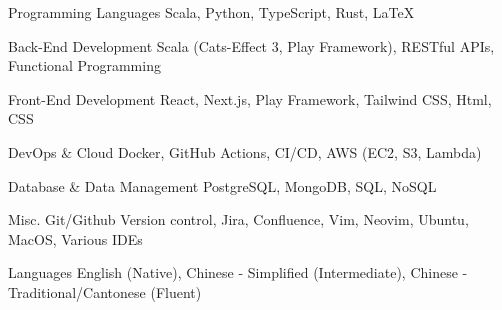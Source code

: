 
\begin{cvskills}

  \cvskill
  {Programming Languages} %
  {Scala, Python, TypeScript, Rust, LaTeX} %

  \cvskill
  {Back-End Development} %
  {Scala (Cats-Effect 3, Play Framework), RESTful APIs, Functional Programming} %

  \cvskill
  {Front-End Development} %
  {React, Next.js, Play Framework, Tailwind CSS, Html, CSS} %

  \cvskill
  {DevOps \& Cloud} %
  {Docker, GitHub Actions, CI/CD, AWS (EC2, S3, Lambda)} %

  \cvskill
  {Database \& Data Management} %
  {PostgreSQL, MongoDB, SQL, NoSQL} %

\cvskill
  {Misc.} %
  {Git/Github Version control, Jira, Confluence, Vim, Neovim, Ubuntu, MacOS, Various IDEs} %


  \cvskill
  {Languages} %
  {English (Native), Chinese - Simplified (Intermediate), Chinese - Traditional/Cantonese (Fluent)} %

\end{cvskills}
